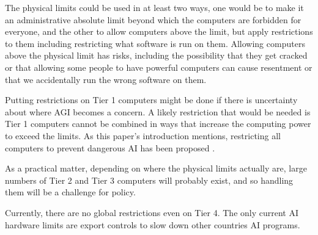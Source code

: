 \documentclass[letterpaper,twocolumn]{article}
\begin{document}
The physical limits could be used in at least two ways, one would be
to make it an administrative absolute limit beyond which the computers
are forbidden for everyone, and the other to allow computers above the
limit, but apply restrictions to them including restricting what
software is run on them. Allowing computers above the physical limit has
risks, including the possibility that they get cracked or that
allowing some people to have powerful computers can cause resentment or
that we accidentally run the wrong software on them.

Putting restrictions on Tier 1 computers might be done if there is
uncertainty about where AGI becomes a concern. A likely restriction
that would be needed is Tier 1 computers cannot be combined in ways
that increase the computing power to exceed the limits. As this
paper's introduction mentions, restricting all computers to prevent
dangerous AI has been proposed \citep{russellCnnInterview}.

As a practical matter, depending on where the physical limits actually
are, large numbers of Tier 2 and Tier 3 computers will probably exist,
and so handling them will be a challenge for policy.

Currently, there are no global restrictions even on Tier 4. The only
current AI hardware limits are export controls to slow down other
countries AI programs.
\end{document}
